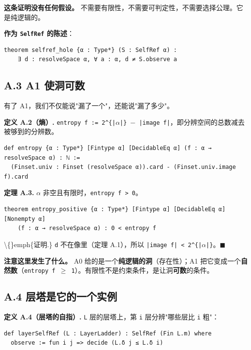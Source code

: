 \documentclass[11pt,a4paper]{ctexart}
\begin{document}
\textbf{这条证明没有任何假设。} 不需要有限性，不需要可判定性，不需要选择公理。它是纯逻辑的。

\textbf{作为 \texttt{SelfRef} 的陈述}：

\begin{lstlisting}
theorem selfref_hole {α : Type*} (S : SelfRef α) :
    ∃ d : resolveSpace α, ∀ a : α, d ≠ S.observe a
\end{lstlisting}

\subsection{A.3 A1 使洞可数}

有了 A1，我们不仅能说"漏了一个"，还能说"漏了多少"。

\textbf{定义 A.2（熵）.} \texttt{entropy f := 2\textasciicircum{}\{|\ensuremath{\alpha}|\} \ensuremath{-} |image f|}，即分辨空间的总数减去被够到的分辨数。

\begin{lstlisting}
def entropy {α : Type*} [Fintype α] [DecidableEq α] (f : α → resolveSpace α) : ℕ :=
  (Finset.univ : Finset (resolveSpace α)).card - (Finset.univ.image f).card
\end{lstlisting}

\textbf{定理 A.3.} \texttt{\ensuremath{\alpha}} 非空且有限时，\texttt{entropy f > 0}。

\begin{lstlisting}
theorem entropy_positive {α : Type*} [Fintype α] [DecidableEq α] [Nonempty α]
    (f : α → resolveSpace α) : 0 < entropy f
\end{lstlisting}

\textbackslash\{\}emph\{证明.\} \texttt{d} 不在像里（定理 A.1），所以 \texttt{|image f| < 2\textasciicircum{}\{|\ensuremath{\alpha}|\}}。\ensuremath{\ensuremath{\blacksquare}}

\textbf{注意这里发生了什么。} A0 给的是一个\textbf{纯逻辑的洞}（存在性）；A1 把它变成一个\textbf{自然数}（\texttt{entropy f \ensuremath{\ge} 1}）。有限性不是约束条件，是让洞\textbf{可数}的条件。

\subsection{A.4 层塔是它的一个实例}

\textbf{定义 A.4（层塔的自指）.} \texttt{L} 层的层塔上，第 \texttt{i} 层分辨"哪些层比 \texttt{i} 粗"：

\begin{lstlisting}
def layerSelfRef (L : LayerLadder) : SelfRef (Fin L.m) where
  observe := fun i j => decide (L.δ j ≤ L.δ i)
\end{lstlisting}
\end{document}
